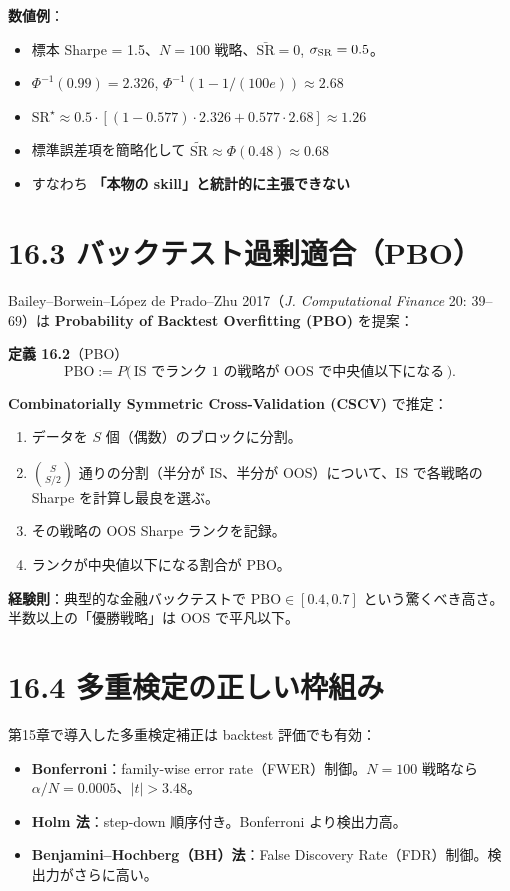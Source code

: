 \documentclass[11pt,a4paper]{report}
\begin{document}
\textbf{数値例}：
\begin{itemize}
\item 標本 Sharpe = 1.5、$N = 100$ 戦略、$\bar{\mathrm{SR}} = 0$, $\sigma_{\rm SR} = 0.5$。
\item $\Phi^{-1}(0.99) = 2.326$, $\Phi^{-1}(1 - 1/(100 e)) \approx 2.68$
\item $\mathrm{SR}^\star \approx 0.5 \cdot [(1 - 0.577) \cdot 2.326 + 0.577 \cdot 2.68] \approx 1.26$
\item 標準誤差項を簡略化して $\widetilde{\mathrm{SR}} \approx \Phi(0.48) \approx 0.68$
\item すなわち \textbf{「本物の skill」と統計的に主張できない}
\end{itemize}

\section{16.3 バックテスト過剰適合（PBO）}

Bailey–Borwein–López de Prado–Zhu 2017（\emph{J. Computational Finance} 20: 39–69）は \textbf{Probability of Backtest Overfitting (PBO)} を提案：

\textbf{定義 16.2}（PBO） \[ \mathrm{PBO} := P\bigl(\,\text{IS でランク 1 の戦略が OOS で中央値以下になる}\,\bigr). \]

\textbf{Combinatorially Symmetric Cross-Validation (CSCV)} で推定：
\begin{enumerate}
\item データを $S$ 個（偶数）のブロックに分割。
\item $\binom{S}{S/2}$ 通りの分割（半分が IS、半分が OOS）について、IS で各戦略の Sharpe を計算し最良を選ぶ。
\item その戦略の OOS Sharpe ランクを記録。
\item ランクが中央値以下になる割合が PBO。
\end{enumerate}

\textbf{経験則}：典型的な金融バックテストで $\mathrm{PBO} \in [0.4, 0.7]$ という驚くべき高さ。半数以上の「優勝戦略」は OOS で平凡以下。

\section{16.4 多重検定の正しい枠組み}

第15章で導入した多重検定補正は backtest 評価でも有効：

\begin{itemize}
\item \textbf{Bonferroni}：family-wise error rate（FWER）制御。$N = 100$ 戦略なら $\alpha/N = 0.0005$、$|t| > 3.48$。
\item \textbf{Holm 法}：step-down 順序付き。Bonferroni より検出力高。
\item \textbf{Benjamini–Hochberg（BH）法}：False Discovery Rate（FDR）制御。検出力がさらに高い。
\end{itemize}
\end{document}
